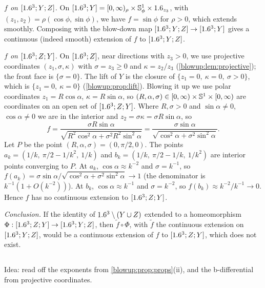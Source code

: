 \emph{$f$ on $[1.6^3;Y;Z]$.} On $[1.6^3;Y]=[0,\infty)_\rho\times\mathbb{S}^1_\phi\times1.6_{z_3}$, with
$(z_1,z_2)=\rho(\cos\phi,\sin\phi)$, we have $f=\sin\phi$ for $\rho>0$, which extends smoothly.
Composing with the blow-down map $[1.6^3;Y;Z]\to[1.6^3;Y]$ gives a continuous (indeed smooth)
extension of $f$ to $[1.6^3;Y;Z]$.

\emph{$f$ on $[1.6^3;Z;Y]$.} On $[1.6^3;Z]$, near directions with $z_3>0$, we use projective
coordinates $(z_1,\sigma,\kappa)$ with $\sigma=z_3\ge0$ and $\kappa=z_2/z_3$
(\cref{blowup:lem:projective}); the front face is $\{\sigma=0\}$. The lift of $Y$ is the closure
of $\{z_1=0,\ \kappa=0,\ \sigma>0\}$, which is $\{z_1=0,\ \kappa=0\}$ (\cref{blowup:prop:lift}).
Blowing it up we use polar coordinates $z_1=R\cos\alpha$, $\kappa=R\sin\alpha$, so
$(R,\alpha,\sigma)\in[0,\infty)\times\mathbb{S}^1\times[0,\infty)$ are coordinates on an open set of
$[1.6^3;Z;Y]$. Where $R,\sigma>0$ and $\sin\alpha\ne0$, $\cos\alpha\ne0$ we are in the interior and
$z_2=\sigma\kappa=\sigma R\sin\alpha$, so
\begin{equation*}
  f=\frac{\sigma R\sin\alpha}{\sqrt{R^2\cos^2\alpha+\sigma^2R^2\sin^2\alpha}}
  =\frac{\sigma\sin\alpha}{\sqrt{\cos^2\alpha+\sigma^2\sin^2\alpha}}.
\end{equation*}
Let $P$ be the point $(R,\alpha,\sigma)=(0,\pi/2,0)$. The points
$a_k=(1/k,\ \pi/2-1/k^2,\ 1/k)$ and $b_k=(1/k,\ \pi/2-1/k,\ 1/k^2)$ are interior points
converging to $P$. At $a_k$, $\cos\alpha\approx k^{-2}$ and $\sigma=k^{-1}$, so
$f(a_k)=\sigma\sin\alpha/\sqrt{\cos^2\alpha+\sigma^2\sin^2\alpha}\to1$ (the denominator is
$k^{-1}(1+O(k^{-2}))$). At $b_k$, $\cos\alpha\approx k^{-1}$ and $\sigma=k^{-2}$, so
$f(b_k)\approx k^{-2}/k^{-1}\to0$. Hence $f$ has no continuous extension to $[1.6^3;Z;Y]$.

\emph{Conclusion.} If the identity of $1.6^3\setminus(Y\cup Z)$ extended to a homeomorphism
$\Phi:[1.6^3;Z;Y]\to[1.6^3;Y;Z]$, then $\tilde f\circ\Phi$, with $\tilde f$ the continuous extension
on $[1.6^3;Y;Z]$, would be a continuous extension of $f$ to $[1.6^3;Z;Y]$, which does not exist.

\subsection*{}
Idea: read off the exponents from \cref{blowup:prop:props}(ii), and the b-differential from
projective coordinates.


